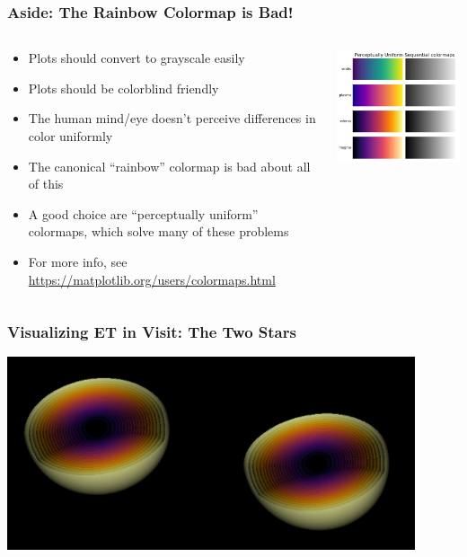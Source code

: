 \documentclass[]{beamer}
\begin{document}
\begin{frame}
  \frametitle{Aside: The Rainbow Colormap is Bad!}
  \begin{columns}
    \begin{column}{6cm}
      \begin{itemize}
      \item Plots should convert to grayscale easily
      \item Plots should be colorblind friendly
      \item The human mind/eye doesn't perceive differences in color
        uniformly
      \item The canonical ``rainbow'' colormap is bad about all of this
      \item A good choice are ``perceptually uniform'' colormaps,
        which solve many of these problems
      \item For more info, see \url{https://matplotlib.org/users/colormaps.html}
      \end{itemize}
    \end{column}
    \begin{column}{6cm}
      \begin{center}
        \includegraphics[width=6cm]{figures/colormaps}
      \end{center}
    \end{column}
  \end{columns}
\end{frame}

\begin{frame}
  \frametitle{Visualizing ET in Visit: The Two Stars}
  \begin{center}
    \includegraphics[width=12cm]{figures/visit/stars-contours}
  \end{center}
\end{frame}
\end{document}
